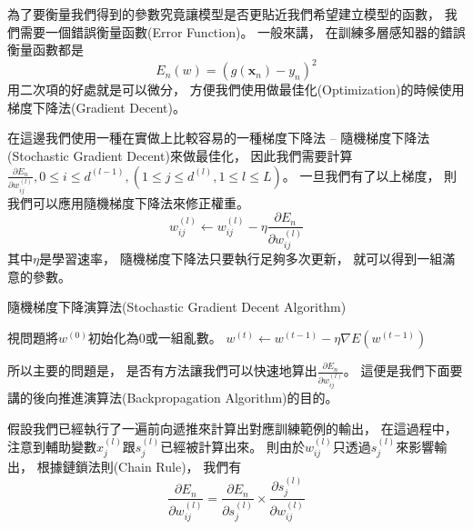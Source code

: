  為了要衡量我們得到的參數究竟讓模型是否更貼近我們希望建立模型的函數，
  我們需要一個錯誤衡量函數(Error Function)。
  一般來講，
  在訓練多層感知器的錯誤衡量函數都是
  \begin{equation}
    E_n(w) = (g(\mathbf{x}_n) - y_n)^2
  \end{equation}
  用二次項的好處就是可以微分，
  方便我們使用做最佳化(Optimization)的時候使用梯度下降法(Gradient Decent)。

  在這邊我們使用一種在實做上比較容易的一種梯度下降法 -- 隨機梯度下降法(Stochastic Gradient Decent)來做最佳化，
  因此我們需要計算$\frac{\partial E_n}{\partial w_{ij}^{(l)}}, 0 \leq i \leq d^{(l-1)}, (1 \leq j \leq d^{(l)}, 1 \leq l \leq L)$。
  一旦我們有了以上梯度，
  則我們可以應用隨機梯度下降法來修正權重。
  \begin{equation}
    w_{ij}^{(l)} \leftarrow w_{ij}^{(l)} - \eta \frac{\partial E_n}{\partial w_{ij}^{(l)}}
  \end{equation}
  其中$\eta$是學習速率，
  隨機梯度下降法只要執行足夠多次更新，
  就可以得到一組滿意的參數。
  \begin{algorithm}
    \caption{隨機梯度下降演算法(Stochastic Gradient Decent Algorithm)}
    \label{alg:stochastic_gradient_decent}
    \begin{algorithmic}[1]
      \STATE 視問題將$w^{(0)}$初始化為0或一組亂數。
	\STATE $w^{(t)} \leftarrow w^{(t-1)} - \eta \nabla E(w^{(t-1)})$
      \ENDFOR
    \end{algorithmic}
  \end{algorithm}
  所以主要的問題是，
  是否有方法讓我們可以快速地算出$\frac{\partial E_n}{\partial w_{ij}^{(l)}}$。
  這便是我們下面要講的後向推進演算法(Backpropagation Algorithm)的目的。

  假設我們已經執行了一遍前向遞推來計算出對應訓練範例的輸出，
  在這過程中，
  注意到輔助變數$x_j^{(l)}$跟$s_j^{(l)}$已經被計算出來。
  則由於$w_{ij}^{(l)}$只透過$s_j^{(l)}$來影響輸出，
  根據鏈鎖法則(Chain Rule)，
  我們有
  \begin{equation}
    \frac{\partial E_n}{\partial w_{ij}^{(l)}} = \frac{\partial E_n}{\partial s_j^{(l)}} \times \frac{\partial s_j^{(l)}}{\partial w_{ij}^{(l)}}
  \end{equation}

